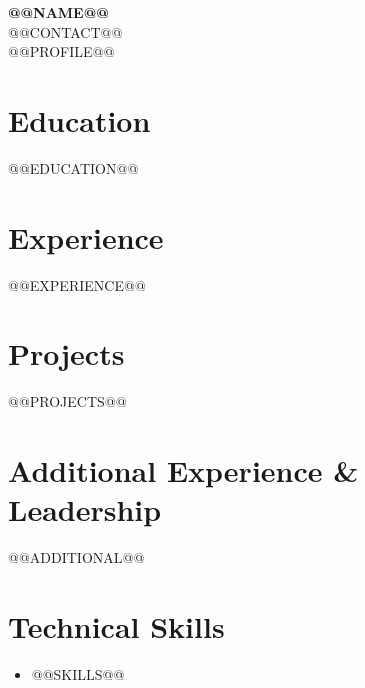 \documentclass[letterpaper,11pt]{article}
\newcommand{\resumeSubHeadingListStart}{\begin{itemize}[leftmargin=0.15in, label={}]}
\newcommand{\resumeSubHeadingListEnd}{\end{itemize}}
\begin{document}
\begin{center}
  \textbf{\Huge @@NAME@@} \\ \vspace{1pt}
  \small @@CONTACT@@ \\ \vspace{2pt}
  @@PROFILE@@
\end{center}

\section{Education}
\resumeSubHeadingListStart
@@EDUCATION@@
\resumeSubHeadingListEnd

\section{Experience}
\resumeSubHeadingListStart
@@EXPERIENCE@@
\resumeSubHeadingListEnd

\section{Projects}
\resumeSubHeadingListStart
@@PROJECTS@@
\resumeSubHeadingListEnd

\section{Additional Experience \& Leadership}
\begin{itemize}[leftmargin=0.15in, label={}]
@@ADDITIONAL@@
\end{itemize}

\section{Technical Skills}
\begin{itemize}[leftmargin=0.15in, label={}]
  \small\item{
@@SKILLS@@
  }
\end{itemize}
\end{document}
